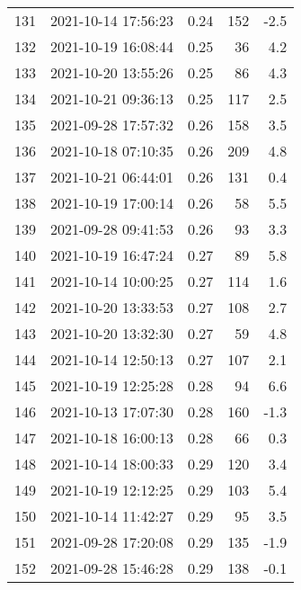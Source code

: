 \begin{tabular}{llrrr}
131 & 2021-10-14 17:56:23 &  0.24 &             152 &                   -2.5 \\
132 & 2021-10-19 16:08:44 &  0.25 &              36 &                    4.2 \\
133 & 2021-10-20 13:55:26 &  0.25 &              86 &                    4.3 \\
134 & 2021-10-21 09:36:13 &  0.25 &             117 &                    2.5 \\
135 & 2021-09-28 17:57:32 &  0.26 &             158 &                    3.5 \\
136 & 2021-10-18 07:10:35 &  0.26 &             209 &                    4.8 \\
137 & 2021-10-21 06:44:01 &  0.26 &             131 &                    0.4 \\
138 & 2021-10-19 17:00:14 &  0.26 &              58 &                    5.5 \\
139 & 2021-09-28 09:41:53 &  0.26 &              93 &                    3.3 \\
140 & 2021-10-19 16:47:24 &  0.27 &              89 &                    5.8 \\
141 & 2021-10-14 10:00:25 &  0.27 &             114 &                    1.6 \\
142 & 2021-10-20 13:33:53 &  0.27 &             108 &                    2.7 \\
143 & 2021-10-20 13:32:30 &  0.27 &              59 &                    4.8 \\
144 & 2021-10-14 12:50:13 &  0.27 &             107 &                    2.1 \\
145 & 2021-10-19 12:25:28 &  0.28 &              94 &                    6.6 \\
146 & 2021-10-13 17:07:30 &  0.28 &             160 &                   -1.3 \\
147 & 2021-10-18 16:00:13 &  0.28 &              66 &                    0.3 \\
148 & 2021-10-14 18:00:33 &  0.29 &             120 &                    3.4 \\
149 & 2021-10-19 12:12:25 &  0.29 &             103 &                    5.4 \\
150 & 2021-10-14 11:42:27 &  0.29 &              95 &                    3.5 \\
151 & 2021-09-28 17:20:08 &  0.29 &             135 &                   -1.9 \\
152 & 2021-09-28 15:46:28 &  0.29 &             138 &                   -0.1 \\

\end{tabular}
